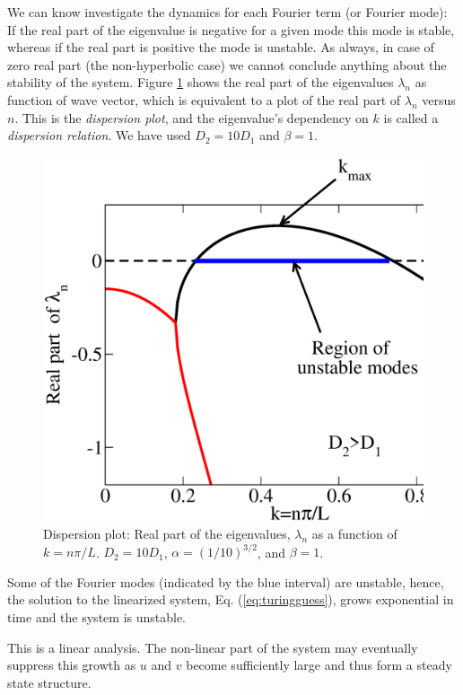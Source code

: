 We can know investigate the dynamics for each Fourier term (or Fourier mode): 
If the real part of the eigenvalue is negative for a given mode
this mode is stable, whereas if the real part is positive the mode is unstable. As always, in case 
of zero real part (the non-hyperbolic case) we cannot conclude anything about the stability of 
the system. Figure \ref{fig:dispersion} shows the real part of the eigenvalues $\lambda_{n}$ 
as function of wave vector, which is equivalent to a plot of the real part of 
$\lambda_n$ versus $n$. This is the \emph{dispersion plot}, 
and the eigenvalue's dependency on $k$ is called a \emph{dispersion relation}. We have used 
$D_2 = 10D_1$ and $\beta=1$. 
\begin{figure}
	\begin{center}
    \includegraphics[scale=.3]{figs/dispersion}
    \caption{
		\label{fig:dispersion} Dispersion plot: Real part of the eigenvalues, $\lambda_{n}$ 
		as a function of $k=n\pi/L$. $D_2 = 10 D_1$, $\alpha = (1/10)^{3/2}$, and $\beta = 1$. 
	}
  \end{center}
\end{figure}
Some of the Fourier modes (indicated by the blue interval) are unstable, hence, the  
solution to the linearized system, Eq. (\ref{eq:turingguess}), grows exponential in time and the 
system is unstable. 

This is a linear analysis. The non-linear part of the system may eventually 
suppress this growth as $u$ and $v$ become sufficiently large and thus form a 
steady state structure. 

